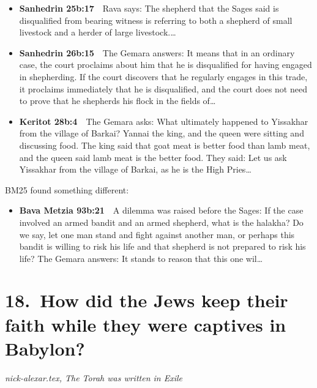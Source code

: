 \documentclass[11pt,a4paper]{article}
\begin{document}
\begin{itemize}[leftmargin=1.2em,itemsep=3pt]
\item {\color{ref}\textbf{Sanhedrin 25b:17}}\ \ Rava says: The shepherd that the Sages said is disqualified from bearing witness is referring to both a shepherd of small livestock and a herder of large livestock.\ldots
\item {\color{ref}\textbf{Sanhedrin 26b:15}}\ \ The Gemara answers: It means that in an ordinary case, the court proclaims about him that he is disqualified for having engaged in shepherding. If the court discovers that he regularly engages in this trade, it proclaims immediately that he is disqualified, and the court does not need to prove that he shepherds his flock in the fields of\ldots
\item {\color{ref}\textbf{Keritot 28b:4}}\ \ The Gemara asks: What ultimately happened to Yissakhar from the village of Barkai? Yannai the king, and the queen were sitting and discussing food. The king said that goat meat is better food than lamb meat, and the queen said lamb meat is the better food. They said: Let us ask Yissakhar from the village of Barkai, as he is the High Pries\ldots
\end{itemize}
{\color{quiet}\small BM25 found something different:}
\begin{itemize}[leftmargin=1.2em]
\item {\color{ref}\textbf{Bava Metzia 93b:21}}\ \ A dilemma was raised before the Sages: If the case involved an armed bandit and an armed shepherd, what is the halakha? Do we say, let one man stand and fight against another man, or perhaps this bandit is willing to risk his life and that shepherd is not prepared to risk his life? The Gemara answers: It stands to reason that this one wil\ldots
\end{itemize}

\section*{18.\ How did the Jews keep their faith while they were captives in Babylon?}
{\color{quiet}\small\textit{nick-alexar.tex, The Torah was written in Exile}}
\end{document}
